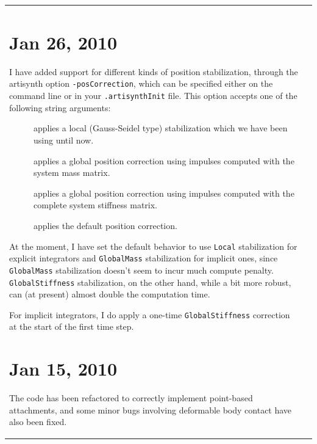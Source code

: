 \documentclass{article}
\begin{document}
\begin{tabular}{ll}
\section*{Jan 26, 2010}

I have added support for different kinds of position stabilization,
through the artisynth option {\tt -posCorrection}, which can be specified
either on the command line or in your {\tt .artisynthInit} file. This
option accepts one of the following string arguments:

\begin{description}

\item[{\tt Local}]  \mbox{}

 applies a local (Gauss-Seidel type) stabilization which we have been using 
 until now.

\item[{\tt GlobalMass}]  \mbox{}

 applies a global position correction using impulses computed with the
 system mass matrix.

\item[{\tt GlobalStiffness}] \mbox{}

 applies a global position correction using impulses computed with the
 complete system stiffness matrix.

\item[{\tt Default}] \mbox{}

 applies the default position correction.

\end{description}

At the moment, I have set the default behavior to use {\tt Local}
stabilization for explicit integrators and {\tt GlobalMass} stabilization
for implicit ones, since {\tt GlobalMass} stabilization doesn't seem to
incur much compute penalty. {\tt GlobalStiffness} stabilization, on the
other hand, while a bit more robust, can (at present) almost double
the computation time.

For implicit integrators, I do apply a one-time {\tt GlobalStiffness}
correction at the start of the first time step.

\section*{Jan 15, 2010}

The code has been refactored to correctly implement point-based
attachments, and some minor bugs involving deformable body contact
have also been fixed.


\end{tabular}
\end{document}
